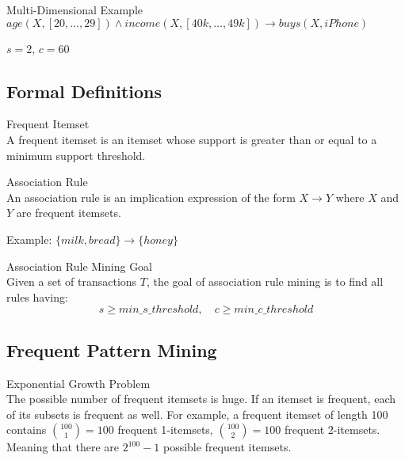 \begin{example2}{Multi-Dimensional Example}\\
$age(X, [20,\ldots,29]) \land income(X, [40k,\ldots,49k]) \rightarrow buys(X, iPhone)$

$s = 2$, $c = 60$
\end{example2}

\subsection{Formal Definitions}

\begin{definition}{Frequent Itemset}\\
A frequent itemset is an itemset whose support is greater than or equal to a minimum support threshold.
\end{definition}

\begin{definition}{Association Rule}\\
An association rule is an implication expression of the form $X \rightarrow Y$ where $X$ and $Y$ are frequent itemsets.

Example: $\{milk, bread\} \rightarrow \{honey\}$
\end{definition}

\begin{definition}{Association Rule Mining Goal}\\
Given a set of transactions $T$, the goal of association rule mining is to find all rules having:
$$s \geq min\_s\_threshold, \quad c \geq min\_c\_threshold$$
\end{definition}


\subsection{Frequent Pattern Mining}

\begin{concept}{Exponential Growth Problem}\\
The possible number of frequent itemsets is huge. If an itemset is frequent, each of its subsets is frequent as well. For example, a frequent itemset of length 100 contains $\binom{100}{1} = 100$ frequent 1-itemsets, $\binom{100}{2} = 100$ frequent 2-itemsets. Meaning that there are $2^{100} - 1$ possible frequent itemsets.
\end{concept}

